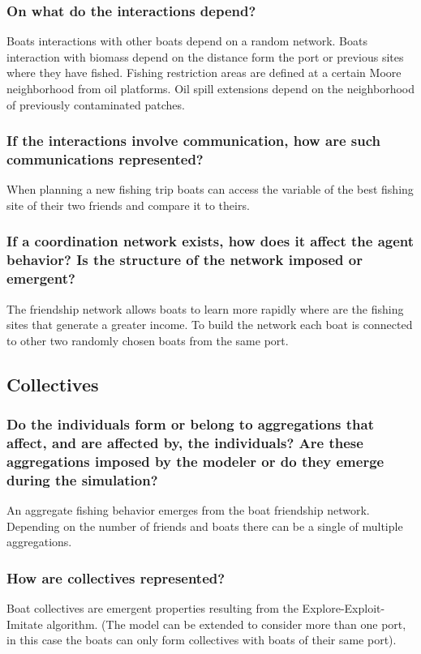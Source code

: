 \documentclass[11pt]{article}
\begin{document}
\subsubsection{On what do the interactions depend?}
\label{sec:orgff3e200}
Boats interactions with other boats depend on a random network. Boats interaction with biomass depend on the distance form the port or previous sites where they have fished. Fishing restriction areas are defined at a certain Moore neighborhood from oil platforms. Oil spill extensions depend on the neighborhood of previously contaminated patches. 
\subsubsection{If the interactions involve communication, how are such communications represented?}
\label{sec:orgc18340a}
When planning a new fishing trip boats can access the variable of the best fishing site of their two friends and compare it to theirs.
\subsubsection{If a coordination network exists, how does it affect the agent behavior? Is the structure of the network imposed or emergent?}
\label{sec:org6215c28}
The friendship network allows boats to learn more rapidly where are the fishing sites that generate a greater income. To build the network each boat is connected to other two randomly chosen boats from the same port. 
\subsection{Collectives}
\label{sec:orgb94d5e0}
\subsubsection{Do the individuals form or belong to aggregations that affect, and are affected by, the individuals? Are these aggregations imposed by the modeler or do they emerge during the simulation?}
\label{sec:org9a52bd0}
An aggregate fishing behavior emerges from the boat friendship network. Depending on the number of friends and boats there can be a single of multiple aggregations.
\subsubsection{How are collectives represented?}
\label{sec:orga38ea41}
Boat collectives are emergent properties resulting from the Explore-Exploit-Imitate algorithm. (The model can be extended to consider more than one port, in this case the boats can only form collectives with boats of their same port).
\end{document}
